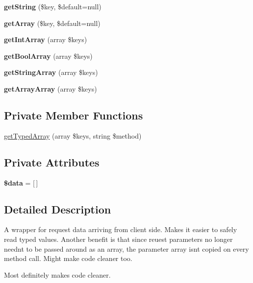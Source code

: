 \begin{DoxyCompactItemize}
{\bfseries get\+String} (\$key, \$default=null)
\item 
\mbox{\label{class_request_data_af06da642a5e374ae44f35473971fe117}} 
{\bfseries get\+Array} (\$key, \$default=null)
\item 
\mbox{\label{class_request_data_a853b5161c2de226a00f31fb6dfcbd93d}} 
{\bfseries get\+Int\+Array} (array \$keys)
\item 
\mbox{\label{class_request_data_ad00cd3a1c703f0a7e2df35d873b3fd01}} 
{\bfseries get\+Bool\+Array} (array \$keys)
\item 
\mbox{\label{class_request_data_a0566129c074d52a4db99520e7092b68c}} 
{\bfseries get\+String\+Array} (array \$keys)
\item 
\mbox{\label{class_request_data_a9197f1583e1ad33cbd28fbc10b339fb5}} 
{\bfseries get\+Array\+Array} (array \$keys)
\end{DoxyCompactItemize}
\subsection*{Private Member Functions}
\begin{DoxyCompactItemize}
\item 
\hyperlink{class_request_data_aad8cc8d83c11936ce64f708392057942}{get\+Typed\+Array} (array \$keys, string \$method)
\end{DoxyCompactItemize}
\subsection*{Private Attributes}
\begin{DoxyCompactItemize}
\item 
\mbox{\label{class_request_data_a6efc15b5a2314dd4b5aaa556a375c6d6}} 
{\bfseries \$data} = \mbox{[}$\,$\mbox{]}
\end{DoxyCompactItemize}


\subsection{Detailed Description}
A wrapper for request data arriving from client side. Makes it easier to safely read typed values. Another benefit is that since reuest parameters no longer needn\textquotesingle{}t to be passed around as an array, the parameter array isn\textquotesingle{}t copied on every method call. Might make code cleaner too.
\begin{DoxyItemize}
\item Most definitely makes code cleaner.
\end{DoxyItemize}

